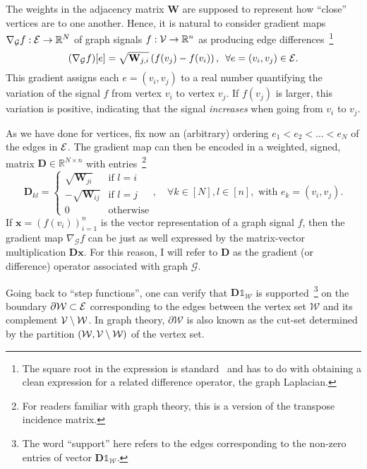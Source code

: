 The weights in the adjacency matrix $\mathbf{W}$ are supposed to represent how ``close'' vertices are to one another. Hence, it is natural to consider gradient maps $\nabla_{\mathcal{G}}f : \mathcal{E} \to \mathbb{R}^{N}$ of graph signals $f : \mathcal{V} \to \mathbb{R}^{n}$ as producing edge differences~\footnote{The square root in the expression is standard~\cite{shuman2013} and has to do with obtaining a clean expression for a related difference operator, the graph Laplacian.}
\begin{equation}
    (\nabla_{\mathcal{G}} f)[e] = \sqrt{\mathbf{W}_{j,i}} \left ( f(v_j) - f(v_i) \right ), \enspace \forall e = (v_i, v_j) \in \mathcal{E}.
\end{equation}
This gradient assigns each $e = (v_i, v_j)$ to a real number quantifying the variation of the signal $f$ from vertex $v_i$ to vertex $v_j$. If $f(v_j)$ is larger, this variation is positive, indicating that the signal \emph{increases} when going from $v_i$ to $v_j$.

As we have done for vertices, fix now an (arbitrary) ordering $e_1 < e_2 < \dots < e_N$ of the edges in $\mathcal{E}$. The gradient map can then be encoded in a weighted, signed, matrix $\mathbf{D} \in \mathbb{R}^{N \times n}$ with entries~\footnote{For readers familiar with graph theory, this is a version of the transpose incidence matrix.}
\begin{equation}
    \mathbf{D}_{kl} = \left \{
        \begin{matrix}
            \sqrt{\mathbf{W}_{ji}} & \text{if } l = i \\
            -\sqrt{\mathbf{W}_{ij}} & \text{if } l = j \\
            0 & \text{otherwise}
        \end{matrix}
    \right.,
    \quad \forall k \in [N], l \in [n], \text{ with } e_k = (v_i, v_j).
\end{equation}
If $\mathbf{x} = (f(v_i))_{i = 1}^n$ is the vector representation of a graph signal $f$, then the gradient map $\nabla_{\mathcal{G}} f$ can be just as well expressed by the matrix-vector multiplication $\mathbf{Dx}$. For this reason, I will refer to $\mathbf{D}$ as the gradient (or difference) operator associated with graph $\mathcal{G}$.

Going back to ``step functions'', one can verify that $\mathbf{D} \mathbb{1}_\mathcal{W}$ is supported~\footnote{The word ``support'' here refers to the edges corresponding to the non-zero entries of vector $\mathbf{D} \mathbb{1}_\mathcal{W}$.} on the boundary $\partial \mathcal{W} \subset \mathcal{E}$ corresponding to the edges between the vertex set $\mathcal{W}$ and its complement $\mathcal{V} \setminus \mathcal{W}$. In graph theory, $\partial \mathcal{W}$ is also known as the cut-set determined by the partition $(\mathcal{W}, \mathcal{V} \setminus \mathcal{W})$ of the vertex set.

